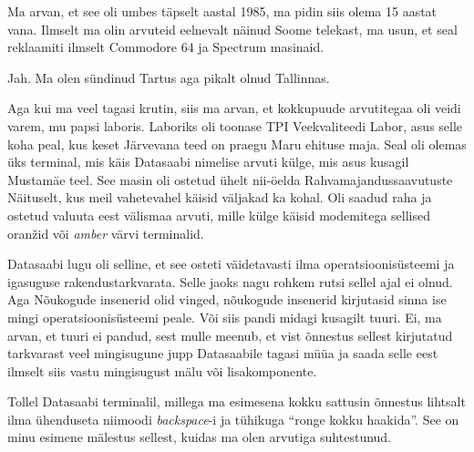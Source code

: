 

Ma arvan, et see oli umbes täpselt aastal 1985, ma pidin siis olema 15 aastat 
vana. Ilmselt ma olin arvuteid eelnevalt näinud Soome telekast, ma usun, et 
seal reklaamiti ilmselt Commodore 64 ja Spectrum masinaid. 


Jah. Ma olen sündinud Tartus aga pikalt olnud Tallinnas. 

Aga kui ma veel tagasi krutin, siis ma arvan, et kokkupuude arvutitegaa oli 
veidi varem, mu papsi laboris. Laboriks oli toonase TPI Veekvaliteedi 
Labor, asus selle koha peal, 
kus keset Järvevana teed on praegu Maru ehituse maja. Seal oli olemas üks 
terminal, mis käis Datasaabi nimelise 
arvuti külge, mis asus kusagil Mustamäe teel. 
See masin oli ostetud ühelt nii-öelda Rahvamajandussaavutuste Näituselt, kus 
meil vahetevahel käisid väljakad ka kohal. Oli saadud raha ja ostetud valuuta 
eest välismaa arvuti, mille külge käisid modemitega sellised oranžid või 
\emph{amber} värvi terminalid. 

Datasaabi lugu oli selline, et see osteti väidetavasti ilma 
operatsioonisüsteemi ja igasuguse rakendustarkvarata. Selle jaoks nagu rohkem 
rutsi sellel ajal ei olnud. Aga Nõukogude insenerid olid vinged, nõukogude 
insenerid kirjutasid sinna ise mingi operatsioonisüsteemi peale. Või siis pandi 
midagi kusagilt tuuri. Ei, ma arvan, et tuuri ei pandud, sest mulle meenub, et 
vist õnnestus sellest kirjutatud tarkvarast veel mingisugune jupp Datasaabile 
tagasi müüa ja saada selle eest ilmselt siis vastu mingisugust mälu või 
lisakomponente. 

Tollel Datasaabi terminalil, millega ma esimesena kokku sattusin õnnestus 
lihtsalt ilma ühenduseta niimoodi \emph{backspace}-i ja  tühikuga 
\enquote{ronge kokku haakida}. See on minu esimene mälestus sellest, kuidas ma 
olen arvutiga suhtestunud. 

